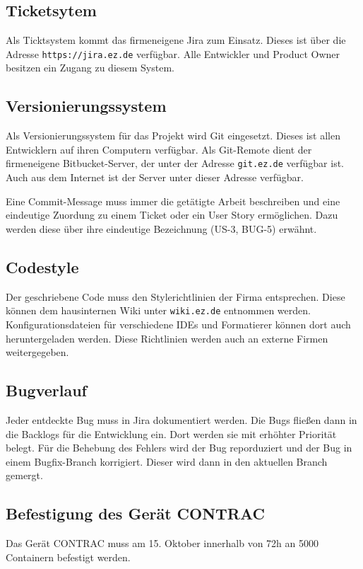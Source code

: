 \subsection{Ticketsytem}
Als Ticktsystem kommt das firmeneigene Jira zum Einsatz. Dieses ist über die Adresse \texttt{https://jira.ez.de} verfügbar. Alle Entwickler und Product Owner besitzen ein Zugang zu diesem System.
\subsection{Versionierungssystem}
Als Versionierungssystem für das Projekt wird Git eingesetzt. Dieses ist allen Entwicklern auf ihren Computern verfügbar. Als Git-Remote dient der firmeneigene Bitbucket-Server, der unter der Adresse \texttt{git.ez.de} verfügbar ist. Auch aus dem Internet ist der Server unter dieser Adresse verfügbar.

Eine Commit-Message muss immer die getätigte Arbeit beschreiben und eine eindeutige Zuordung zu einem Ticket oder ein User Story ermöglichen. Dazu werden diese über ihre eindeutige Bezeichnung (US-3, BUG-5) erwähnt.
\subsection{Codestyle}
Der geschriebene Code muss den Stylerichtlinien der Firma entsprechen. Diese können dem hausinternen Wiki unter \texttt{wiki.ez.de} entnommen werden. Konfigurationsdateien für verschiedene IDEs und Formatierer können dort auch heruntergeladen werden. Diese Richtlinien werden auch an externe Firmen weitergegeben. 
\subsection{Bugverlauf}
Jeder entdeckte Bug muss in Jira dokumentiert werden. Die Bugs fließen dann in die Backlogs für die Entwicklung ein. Dort werden sie mit erhöhter Priorität belegt.
Für die Behebung des Fehlers wird der Bug reporduziert und der Bug in einem Bugfix-Branch korrigiert. Dieser wird dann in den aktuellen Branch gemergt.


\subsection{Befestigung des Gerät CONTRAC}
Das Gerät CONTRAC muss am 15. Oktober innerhalb von 72h an 5000 Containern befestigt werden.

